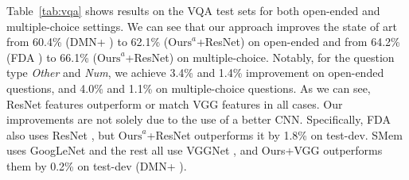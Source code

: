 \documentclass{article}
\begin{document}
Table~\ref{tab:vqa} shows results on the VQA test sets for both open-ended and multiple-choice settings. We can see that our approach improves the state of art from 60.4\% (DMN+ \cite{xiong2016dynamic}) to 62.1\% ($\textrm{Ours}^a$+ResNet) on open-ended and from 64.2\% (FDA \cite{Ilievski2016}) to 66.1\% ($\textrm{Ours}^a$+ResNet) on multiple-choice. Notably, for the question type \textit{Other} and \textit{Num}, we achieve 3.4\% and 1.4\% improvement on open-ended questions, and 4.0\% and 1.1\% on multiple-choice questions. As we can see, ResNet features outperform or match VGG features in all cases. Our improvements are not solely due to the use of a better CNN. Specifically, FDA \cite{Ilievski2016} also uses ResNet \cite{he2015deep}, but $\textrm{Ours}^a$+ResNet outperforms it by 1.8\% on test-dev. SMem \cite{xu2015ask} uses GoogLeNet \cite{szegedy2015going} and the rest all use VGGNet \cite{Simonyan14c}, and Ours+VGG outperforms them by 0.2\% on test-dev (DMN+ \cite{xiong2016dynamic}). 
\end{document}
